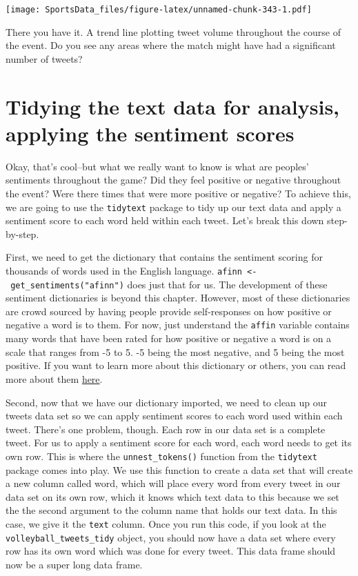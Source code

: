 \documentclass[
]{book}
\begin{document}
\texttt{[image: SportsData\_files/figure-latex/unnamed-chunk-343-1.pdf]}

There you have it. A trend line plotting tweet volume throughout the course of the event. Do you see any areas where the match might have had a significant number of tweets?

\hypertarget{tidying-the-text-data-for-analysis-applying-the-sentiment-scores}{%
\section{Tidying the text data for analysis, applying the sentiment scores}\label{tidying-the-text-data-for-analysis-applying-the-sentiment-scores}}

Okay, that's cool--but what we really want to know is what are peoples' sentiments throughout the game? Did they feel positive or negative throughout the event? Were there times that were more positive or negative? To achieve this, we are going to use the \texttt{tidytext} package to tidy up our text data and apply a sentiment score to each word held within each tweet. Let's break this down step-by-step.

First, we need to get the dictionary that contains the sentiment scoring for thousands of words used in the English language. \texttt{afinn\ \textless{}-\ get\_sentiments("afinn")} does just that for us. The development of these sentiment dictionaries is beyond this chapter. However, most of these dictionaries are crowd sourced by having people provide self-responses on how positive or negative a word is to them. For now, just understand the \texttt{affin} variable contains many words that have been rated for how positive or negative a word is on a scale that ranges from -5 to 5. -5 being the most negative, and 5 being the most positive. If you want to learn more about this dictionary or others, you can read more about them \href{https://www.tidytextmining.com/sentiment.html}{here}.

Second, now that we have our dictionary imported, we need to clean up our tweets data set so we can apply sentiment scores to each word used within each tweet. There's one problem, though. Each row in our data set is a complete tweet. For us to apply a sentiment score for each word, each word needs to get its own row. This is where the \texttt{unnest\_tokens()} function from the \texttt{tidytext} package comes into play. We use this function to create a data set that will create a new column called word, which will place every word from every tweet in our data set on its own row, which it knows which text data to this because we set the the second argument to the column name that holds our text data. In this case, we give it the \texttt{text} column. Once you run this code, if you look at the \texttt{volleyball\_tweets\_tidy} object, you should now have a data set where every row has its own word which was done for every tweet. This data frame should now be a super long data frame.
\end{document}
